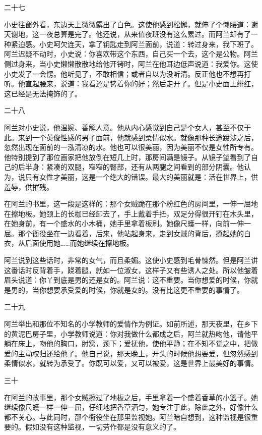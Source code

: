 二十七 

小史往窗外看，东边天上微微露出了白色。这使他感到松懈，就伸了个懒腰道：谢天谢地，这一夜总算是完了。他还说，从来值夜班没有这么累过。而阿兰却有了一种紧迫感。小史呵欠连天，拿了钥匙走到阿兰面前，说道：转过身来，我下班了。阿兰迟疑不动时，小史说：你喜欢带这个东西，自己买一个去，这个是公物。阿兰侧过身来，当小史懒懒散散地给他开铐时，阿兰在他耳边低声说道：我爱你。这使小史发了一会愣。他听见了，不敢相信；或者自以为没听清。反正他也不想再打听。他直起腰来，说道：我看还是铐着你的好；然后走开了。但是小史面上绯红，这已经是无法掩饰的了。 

二十八 

阿兰对小史说，他温婉、善解人意。他从内心感觉到自己是个女人，甚至不仅于此。来到一个英俊性感的男子面前，他就感到柔情似水。就像那种长途跋涉之后，忽然出现在面前的一泓清凉的水。他也可以很美丽，因为美丽不仅是女性所专有。他特别提到了那位画家把他放倒在短几上时，那房间满是镜子。从镜子望看到了自己的后半身：紧凑的双腿，窄窄的臀部，还有从两腿之间看到的部分阴囊。他认为，说只有女性才美丽，这是一个绝大的错误。最大的美丽就是：活在世界上，供羞辱，供摧残。 

在阿兰的书里，这一段是这样的：那个女贼跪在那个粉红色的房间里，一伸一屈地在擦地板。她颈上的长枷已经卸去了，手上戴着手扭，双足分得很开钉在木头里，在她身前，有一个盛水的小木桶，她手里拿着板刷。她像尺蠖一样，向前一伸一屈。那个衙役坐在一边看着，后来，他站起身来，走到女贼的背后，撩起她的白衣，从后面使用她……而她继续在擦地板。 

阿兰说到这些话时，非常的女气，而且柔媚。这使小史感到毛骨悚然。但是阿兰讲这番话时反背着手，跷着腿，就如一位淑女，这样子又有些诱人之处。所以他皱着眉头说道：你丫到底是男的还是女的。阿兰说：这不重要。当你想爱的时候，你就是男的，当你想要承受爱的时候，你就是女的。没有比这更不重要的事情了。 

二十九 

阿兰举出和那位不知名的小学教师的爱情作为例证。如前所述，那天夜里，在乡下的黄泥巴房子里，小学教师说道：你对我做什么都成之后，阿兰就热吻他，请他平躺在床上，吻他的胸口，肘窝，颈下；爱抚他，使他平静；在不知不觉之中，把做爱的主动权归还给他了。他自己说，那天晚上，开头的时候他想要爱，但忽然感到柔情似水，就转为承受了。你既可以爱，又可以被爱，这是世界上最美好的事情。 

三十 

在阿兰的故事里，那个女贼擦过了地板之后，手里拿着一个盛着香草的小篮子。她继续像尺蠖一样一伸一屈，仔细地把香草洒匀，她专注于此，除此之外，好像什么都不关心。与此同时，邵个衙役坐在那里监视她。阿兰暗自想到，这种监视是很重要的。假如没有这种监视，一切劳作都是没有意义的了。 

